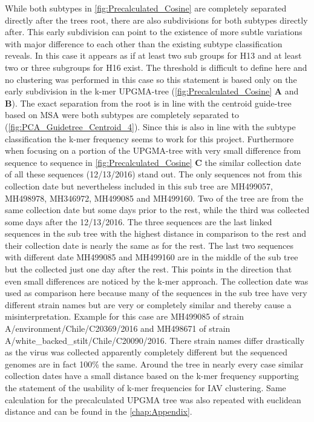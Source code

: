 While both subtypes in \autoref{fig:Precalculated_Cosine} are completely separated directly after the trees root, there are also subdivisions for both subtypes directly after. This early subdivision can point to the existence of more subtle variations with major difference to each other than the existing subtype classification reveals. In this case it appears as if at least two sub groups for H13 and at least two or three subgroups for H16 exist. The threshold is difficult to define here and no clustering was performed in this case so this statement is based only on the early subdivision in the k-mer \gls{UPGMA}-tree (\autoref{fig:Precalculated_Cosine} \textbf{\textsf{A}} and \textbf{\textsf{B}}). The exact separation from the root is in line with the centroid guide-tree based on \gls{MSA} were both subtypes are completely separated to (\autoref{fig:PCA_Guidetree_Centroid_4}). Since this is also in line with the subtype classification the k-mer frequency seems to work for this project. Furthermore when focusing on a portion of the \gls{UPGMA}-tree with very small difference from sequence to sequence in \autoref{fig:Precalculated_Cosine} \textbf{\textsf{C}} the similar collection date of all these sequences (12/13/2016) stand out. The only sequences not from this collection date but nevertheless included in this sub tree are MH499057, MH498978, MH346972, MH499085 and MH499160. Two of the tree are from the same collection date but some days prior to the rest, while the third was collected some days after the 12/13/2016. The three sequences are the last linked sequences in the sub tree with the highest distance in comparison to the rest and their collection date is nearly the same as for the rest. The last two sequences with different date MH499085 and MH499160 are in the middle of the sub tree but the collected just one day after the rest. This points in the direction that even small differences are noticed by the k-mer approach. The collection date was used as comparison here because many of the sequences in the sub tree have very different strain names but are very or completely similar and thereby cause a misinterpretation. Example for this case are MH499085 of strain A/environment/Chile/C20369/2016 and MH498671 of strain A/white\_backed\_stilt/Chile/C20090/2016. There strain names differ drastically as the virus was collected apparently completely different but the sequenced genomes are in fact 100\% the same. Around the tree in nearly every case similar collection dates have a small distance based on the k-mer frequency supporting the statement of the usability of k-mer frequencies for \gls{IAV} clustering. Same calculation for the precalculated \gls{UPGMA} tree was also repeated with euclidean distance and can be found in the \autoref{chap:Appendix}.

